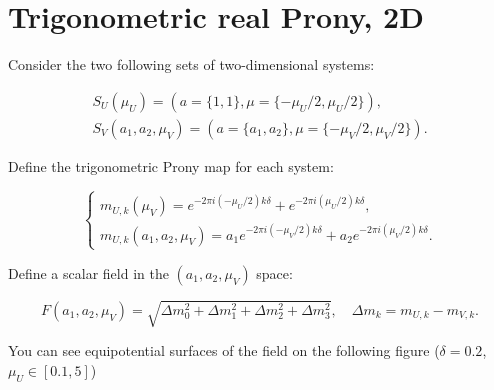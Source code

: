 \section{Trigonometric real Prony, 2D}

Consider the two following sets of two-dimensional systems:

$$
\begin{array}{l}
S_U(\mu_U) = (a = \{1, 1\}, \mu = \{ -\mu_U/2, \mu_U/2 \}),  \\
S_V(a_1, a_2, \mu_V) = (a = \{a_1, a_2\}, \mu = \{ -\mu_V/2, \mu_V/2 \}).
\end{array}
$$

Define the trigonometric Prony map for each system: 

$$
\begin{cases}
m_{U,k}(\mu_V) = e^{-2\pi i (-\mu_U/2) k \delta} + e^{-2\pi i (\mu_U/2) k \delta}, \\
m_{U,k}(a_1, a_2, \mu_V) = a_1 e^{-2\pi i (-\mu_V/2) k \delta} + a_2 e^{-2\pi i (\mu_V/2) k \delta}.
\end{cases}
$$

Define a scalar field in the $(a_1, a_2, \mu_V)$ space:

$$
F(a_1, a_2, \mu_V) = \sqrt{\Delta m_0^2 + \Delta m_1^2 + \Delta m_2^2 + \Delta m_3^2}, \quad \Delta m_k = m_{U,k} - m_{V,k}.
$$

You can see equipotential surfaces of the field on the following figure ($\delta = 0.2$, $\mu_U \in [0.1, 5]$)
  